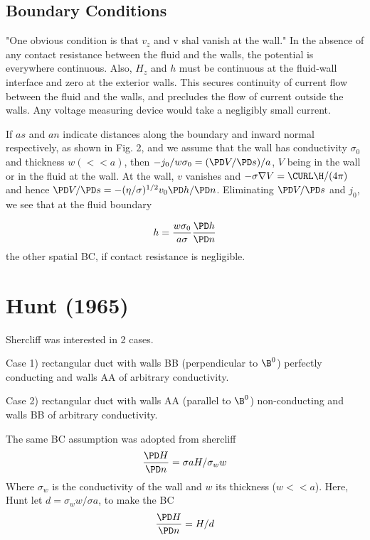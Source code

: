 \documentclass[11pt]{article}
\begin{document}
\subsection{Boundary Conditions}
"One obvious condition is that $v_z$ and v shal vanish at the wall." In the absence of any contact resistance between the fluid and the walls, the potential is everywhere continuous. Also, $H_z$ and $h$ must be continuous at the fluid-wall interface and zero at the exterior walls. This secures continuity of current flow between the fluid and the walls, and precludes the flow of current outside the walls. Any voltage measuring device would take a negligibly small current.

If $as$ and $an$ indicate distances along the boundary and inward normal respectively, as shown in Fig. 2, and we assume that the wall has conductivity $\sigma_0$ and thickness $w (<<a)$, then $-j_0/w \sigma_0 = (\PD V/\PD s)/a$, $V$ being in the wall or in the fluid at the wall. At the wall, $v$ vanishes and $-\sigma \nabla V = \CURL \H/(4 \pi)$ and hence $\PD V/\PD s = -(\eta/\sigma)^{1/2} v_0 \PD h/\PD n$. Eliminating $\PD V/\PD s$ and $j_0$, we see that at the fluid boundary

\begin{equation}
  h = \frac{w \sigma_0}{a \sigma} \frac{\PD h}{\PD n}
\end{equation}
the other spatial BC, if contact resistance is negligible.

\section{Hunt (1965)}
Shercliff was interested in 2 cases.

\noindent
Case 1) rectangular duct with walls BB (perpendicular to $\B^0$) perfectly conducting and walls AA of arbitrary conductivity.

\noindent
Case 2) rectangular duct with walls AA (parallel to $\B^0$) non-conducting and walls BB of arbitrary conductivity.

\noindent
The same BC assumption was adopted from shercliff
\begin{equation}
  \frac{\PD H}{\PD n} = \sigma a H / \sigma_w w
\end{equation}
Where $\sigma_w$ is the conductivity of the wall and $w$ its thickness ($w<<a$). Here, Hunt let $d = \sigma_w w/\sigma a$, to make the BC
\begin{equation}
  \frac{\PD H}{\PD n} = H / d
\end{equation}
\end{document}
